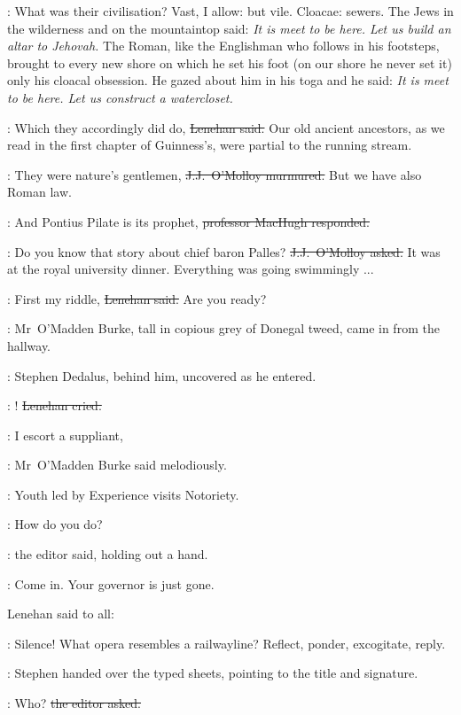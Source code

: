 \machugh:
What was their civilisation?
Vast, I allow:
but vile.
Cloacae: sewers.
The Jews in the wilderness and on the mountaintop said:
\emph{It is meet to be here.
Let us build an altar to Jehovah.}
The Roman,
like the Englishman who follows in his footsteps,
brought to every new shore on which he set his foot
(on our shore he never set it)
only his cloacal obsession.
He gazed about him in his toga
and he said:
\emph{It is meet to be here.
Let us construct a watercloset.}

\lenehan:
Which they accordingly did do,
\sout{Lenehan said.}
Our old ancient ancestors,
as we read in the first chapter of Guinness's,
were partial to the running stream.

\jjom:
They were nature's gentlemen,
\sout{J.J.~O'Molloy murmured.}
But we have also Roman law.%

\machugh:
And Pontius Pilate is its prophet,
\sout{professor MacHugh responded.}

\jjom:
Do you know that story about chief baron Palles?
\sout{J.J.~O'Molloy asked.}
It was at the royal university dinner.
Everything was going swimmingly ...

\lenehan:
First my riddle,
\sout{Lenehan said.}
Are you ready?

:
Mr~O'Madden Burke,
tall in copious grey of Donegal tweed,
came in from the hallway.

:
Stephen Dedalus,
behind him,
uncovered as he entered.

\lenehan:
!
\sout{Lenehan cried.}

\omaddenburke:
I escort a suppliant,

:
Mr~O'Madden Burke said melodiously.

\omaddenburke:
Youth led by Experience visits Notoriety.

\crawford:
How do you do?

:
the editor said,
holding out a hand.

\crawford:
Come in.
Your governor is just gone.



Lenehan said to all:

\lenehan:
Silence!
What opera resembles a railwayline?
Reflect,
ponder,
excogitate,
reply.

:
Stephen handed over the typed sheets,
pointing to the title and signature.

\crawford:
Who?
\sout{the editor asked.}

